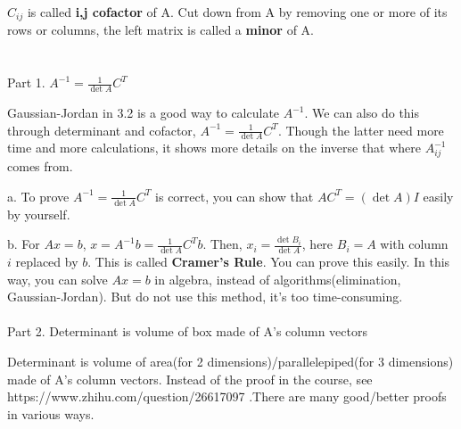 \documentclass{article}
\begin{document}
\begin{spacing}{1.5}
$C_{ij}$ is called {\bfseries i,j cofactor} of A. Cut down from A by removing one or more of its rows or columns, the left matrix is called a {\bfseries minor} of A.


\section{}
Part 1. $A^{-1}=\frac{1}{\det A}C^T$

Gaussian-Jordan in 3.2 is a good way to calculate $A^{-1}$. We can also do this through determinant and cofactor, $A^{-1}=\frac{1}{\det A}C^T$. Though the latter need more time and more calculations, it shows more details on the inverse that where $A^{-1}_{ij}$ comes from.

a. To prove $A^{-1}=\frac{1}{\det A}C^T$ is correct, you can show that $AC^T=(\det A)I$ easily by yourself.

b. For $Ax=b$, $x=A^{-1}b=\frac{1}{\det A}C^Tb$. Then, $x_i=\frac{\det B_i}{\det A}$, here $B_i = A$ with column $i$ replaced by $b$. This is called {\bfseries Cramer's Rule}. You can prove this easily. In this way, you can solve $Ax=b$ in algebra, instead of algorithms(elimination, Gaussian-Jordan). But do not use this method, it's too time-consuming. 
\\\\ Part 2. Determinant is volume of box made of A's column vectors

Determinant is volume of area(for 2 dimensions)/parallelepiped(for 3 dimensions) made of A's column vectors. Instead of the proof in the course, see https://www.zhihu.com/question/26617097 .There are many good/better proofs in various ways.



\end{spacing}
\end{document}
